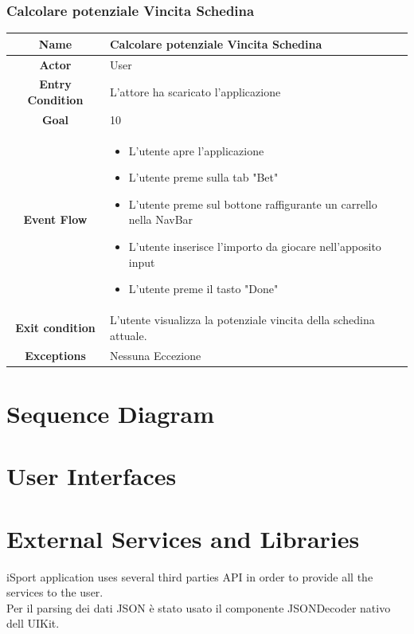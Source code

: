 \documentclass[numbers=noenddot, 12pt, a4paper, oneside]{scrbook}
\begin{document}
\subsection*{Calcolare potenziale Vincita Schedina}
\begin{tabular}{|c|p{}|}
	\hline
	\parbox[c][6ex]{6ex}{\centering \textbf{Name}} & Calcolare potenziale Vincita Schedina\\
	\hline
	\parbox[c][6ex]{6ex}{\centering \textbf{Actor}} & User \\
	\hline
	\parbox[c][10ex]{15ex}{\centering \textbf{Entry Condition}} & L'attore ha scaricato l'applicazione\\
	\hline
	\parbox[c][6ex]{15ex}{\centering \textbf{Goal}} &  10\\
	\hline
	\parbox[c][10ex]{12ex}{\centering \textbf{Event Flow}} & \begin{itemize}
		\item L'utente apre l'applicazione
		\item L'utente preme sulla tab "Bet"
		\item L'utente preme sul bottone raffigurante un carrello nella NavBar
		\item L'utente inserisce l'importo da giocare nell'apposito input
		\item L'utente preme il tasto "Done"
	\end{itemize}\\
	\hline
	\parbox[c][7ex]{12ex}{\centering \textbf{Exit condition}} & L'utente visualizza la potenziale vincita della schedina attuale.\\\hline
	\parbox[c][10ex]{13ex}{\centering \textbf{Exceptions}} & Nessuna Eccezione \\ \hline	
\end{tabular}

\chapter{Sequence Diagram}
\chapter{User Interfaces}
\chapter{External Services and Libraries}
iSport application uses several third parties API in order to provide all the services to the user.\\
Per il parsing dei dati JSON è stato usato il componente JSONDecoder nativo dell UIKit.
\end{document}
